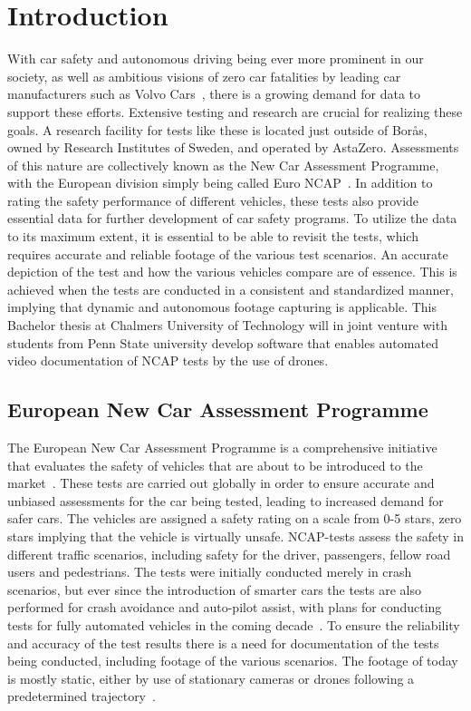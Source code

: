 \chapter{Introduction} \label{Introduction}
With car safety and autonomous driving being ever more prominent in our society, as well as ambitious visions of zero car fatalities by leading car manufacturers such as Volvo Cars~\cite{VOLVOSAFETY}, there is a growing demand for data to support these efforts. Extensive testing and research are crucial for realizing these goals. A research facility for tests like these is located just outside of Borås, owned by Research Institutes of Sweden, and opera\-ted by AstaZero. Assessments of this nature are collectively known as the New Car Assessment Programme, with the European division simply being called Euro NCAP~\cite{EuroNCAPTheProgramme}. In addition to rating the safety performance of different vehicles, these tests also provide essential data for further development of car safety programs. To utilize the data to its maximum extent, it is essential to be able to revisit the tests, which requires accurate and reliable footage of the various test scenarios. An accurate depiction of the test and how the various vehicles compare are of essence. This is achieved when the tests are conducted in a consistent and standardized manner, implying that dynamic and autonomous footage capturing is applicable. This Bachelor thesis at Chalmers University of Technology will in joint venture with students from Penn State university develop software that enables automated video documentation of NCAP tests by the use of drones. 

\section{European New Car Assessment Programme} \label{Background}
The European New Car Assessment Programme is a comprehensive initiative that evaluates the safety of vehicles that are about to be introduced to the market~\cite{EuroNCAPTheProgramme}. These tests are carried out globally in order to ensure accurate and unbiased assessments for the car being tested, leading to increased demand for safer cars. The vehicles are assigned a safety rating on a scale from 0-5 stars, zero stars implying that the vehicle is virtually unsafe. NCAP-tests assess the safety in different traffic scenarios, including safety for the driver, passengers, fellow road users and pedestrians. The tests were initially conducted merely in crash scenarios, but ever since the introduction of smarter cars the tests are also performed for crash avoidance and auto-pilot assist, with plans for conducting tests for fully automated vehicles in the coming decade~\cite{EuroNCAP2022EuroMobility}. 
\bigskip
\newline
To ensure the reliability and accuracy of the test results there is a need for documentation of the tests being conducted, including footage of the various scenarios. The footage of today is mostly static, either by use of stationary cameras or drones following a predetermined trajectory~\cite{EuroNCAP2021FILMPROTOCOL}. 
\newline

